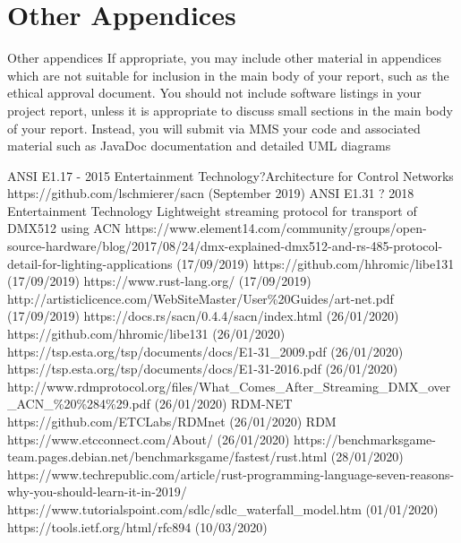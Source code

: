 \documentclass[11pt,a4paper]{article}
\begin{document}
\section{Other Appendices}
Other
appendices
If appropriate, you may include other material in
appendices which are not suitable for inclusion in the
main body of your report, such as the ethical approval
document.
You should not include software listings in your project report, unless it is
appropriate to discuss small sections in the main body of your report. Instead,
you will submit via MMS your code and associated material such as JavaDoc
documentation and detailed UML diagrams

\begin{thebibliography}{9}
	ANSI E1.17 - 2015 Entertainment Technology?Architecture for Control Networks
	https://github.com/lschmierer/sacn (September 2019)
	ANSI E1.31 ? 2018 Entertainment Technology Lightweight streaming protocol for transport of DMX512 using ACN
	https://www.element14.com/community/groups/open-source-hardware/blog/2017/08/24/dmx-explained-dmx512-and-rs-485-protocol-detail-for-lighting-applications (17/09/2019)
	https://github.com/hhromic/libe131 (17/09/2019)
	https://www.rust-lang.org/ (17/09/2019)
	http://artisticlicence.com/WebSiteMaster/User\%20Guides/art-net.pdf (17/09/2019)
	https://docs.rs/sacn/0.4.4/sacn/index.html
	(26/01/2020)
	https://github.com/hhromic/libe131
	(26/01/2020)
	https://tsp.esta.org/tsp/documents/docs/E1-31\_2009.pdf
	(26/01/2020)
	https://tsp.esta.org/tsp/documents/docs/E1-31-2016.pdf
	(26/01/2020)
	http://www.rdmprotocol.org/files/What\_Comes\_After\_Streaming\_DMX\_over\_ACN\_\%20\%284\%29.pdf (26/01/2020)
	RDM-NET
	https://github.com/ETCLabs/RDMnet (26/01/2020)
	RDM
	https://www.etcconnect.com/About/ (26/01/2020)
	https://benchmarksgame-team.pages.debian.net/benchmarksgame/fastest/rust.html (28/01/2020)
	https://www.techrepublic.com/article/rust-programming-language-seven-reasons-why-you-should-learn-it-in-2019/
	https://www.tutorialspoint.com/sdlc/sdlc\_waterfall\_model.htm (01/01/2020)
	https://tools.ietf.org/html/rfc894 (10/03/2020)

\end{thebibliography}
\end{document}
